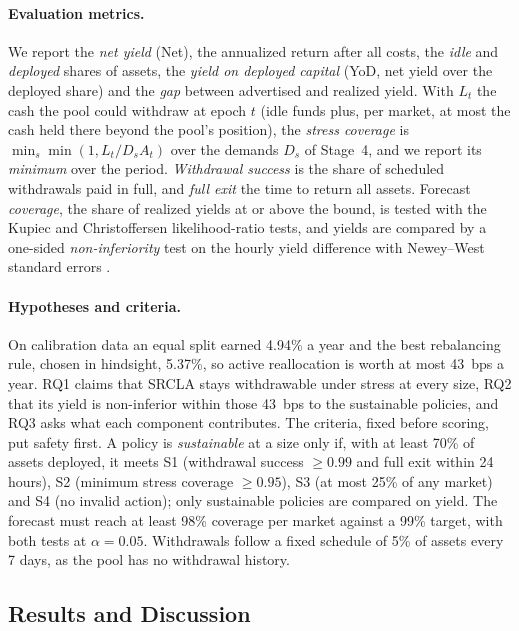 \documentclass[sigconf]{acmart}
\begin{document}
\paragraph{Evaluation metrics.}
We report the \emph{net yield} (Net), the annualized return after all costs, the \emph{idle} and \emph{deployed} shares of assets, the \emph{yield on deployed capital} (YoD, net yield over the deployed share) and the \emph{gap} between advertised and realized yield. With $L_t$ the cash the pool could withdraw at epoch $t$ (idle funds plus, per market, at most the cash held there beyond the pool's position), the \emph{stress coverage} is $\min_s \min(1, L_t / D_s A_t)$ over the demands $D_s$ of Stage~4, and we report its \emph{minimum} over the period. \emph{Withdrawal success} is the share of scheduled withdrawals paid in full, and \emph{full exit} the time to return all assets. Forecast \emph{coverage}, the share of realized yields at or above the bound, is tested with the Kupiec \citep{kupiec1995} and Christoffersen \citep{christoffersen1998} likelihood-ratio tests, and yields are compared by a one-sided \emph{non-inferiority} test on the hourly yield difference with Newey--West standard errors \citep{newey1987}.

\paragraph{Hypotheses and criteria.}
On calibration data an equal split earned 4.94\% a year and the best rebalancing rule, chosen in hindsight, 5.37\%, so active reallocation is worth at most 43~bps a year. RQ1 claims that SRCLA stays withdrawable under stress at every size, RQ2 that its yield is non-inferior within those 43~bps to the sustainable policies, and RQ3 asks what each component contributes. The criteria, fixed before scoring, put safety first. A policy is \emph{sustainable} at a size only if, with at least 70\% of assets deployed, it meets S1 (withdrawal success $\ge 0.99$ and full exit within 24 hours), S2 (minimum stress coverage $\ge 0.95$), S3 (at most 25\% of any market) and S4 (no invalid action); only sustainable policies are compared on yield. The forecast must reach at least 98\% coverage per market against a 99\% target, with both tests at $\alpha = 0.05$. Withdrawals follow a fixed schedule of 5\% of assets every 7 days, as the pool has no withdrawal history.

\subsection{Results and Discussion}
\label{sec:results}
\end{document}
